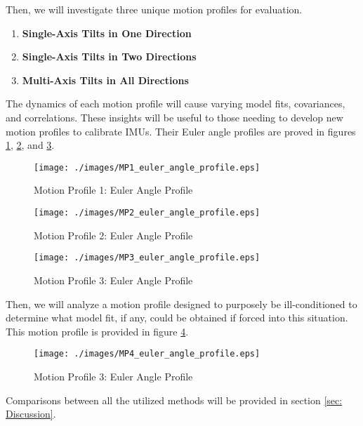 Then, we will investigate three unique motion profiles for evaluation.

\begin{enumerate}
	\item \textbf{Single-Axis Tilts in One Direction}
	\item \textbf{Single-Axis Tilts in Two Directions}
	\item \textbf{Multi-Axis Tilts in All Directions}
\end{enumerate}
	

The dynamics of each motion profile will cause varying model fits, covariances, and correlations. These insights will be useful to those needing to develop new motion profiles to calibrate IMUs. Their Euler angle profiles are proved in figures \ref{fig: MP1 Euler Angle Profile}, \ref{fig: MP2 Euler Angle Profile}, and \ref{fig: MP3 Euler Angle Profile}.

\begin{figure}[h] 
	\centering
	\texttt{[image: ./images/MP1\_euler\_angle\_profile.eps]}
	\caption{Motion Profile 1: Euler Angle Profile}
	\label{fig: MP1 Euler Angle Profile}
\end{figure}
\FloatBarrier

\begin{figure}[h] 
	\centering
	\texttt{[image: ./images/MP2\_euler\_angle\_profile.eps]}
	\caption{Motion Profile 2: Euler Angle Profile}
	\label{fig: MP2 Euler Angle Profile}
\end{figure}
\FloatBarrier

\begin{figure}[h] 
	\centering
	\texttt{[image: ./images/MP3\_euler\_angle\_profile.eps]}
	\caption{Motion Profile 3: Euler Angle Profile}
	\label{fig: MP3 Euler Angle Profile}
\end{figure}
\FloatBarrier

Then, we will analyze a motion profile designed to purposely be ill-conditioned to determine what model fit, if any, could be obtained if forced into this situation. This motion profile is provided in figure \ref{fig: MP4 Euler Angle Profile}.

\begin{figure}[h] 
	\centering
	\texttt{[image: ./images/MP4\_euler\_angle\_profile.eps]}
	\caption{Motion Profile 3: Euler Angle Profile}
	\label{fig: MP4 Euler Angle Profile}
\end{figure}
\FloatBarrier

Comparisons between all the utilized methods will be provided in section \ref{sec: Discussion}.